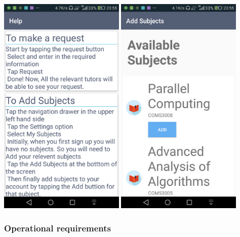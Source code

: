 \documentclass[12pt]{article}
\begin{document}
\begin{flushleft}
\includegraphics[width=60mm]{./Sprint3Models/Screenshot/help.png}
\includegraphics[width=60mm]{./Sprint3Models/Screenshot/addsubjects.png}
\end{flushleft}



\subsubsection{Operational requirements}
\end{document}
